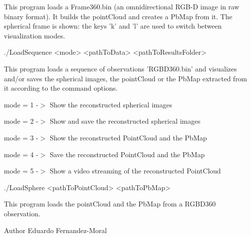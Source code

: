 This program loads a Frame360.\-bin (an omnidirectional R\-G\-B-\/\-D image in raw binary format). It builds the point\-Cloud and creates a Pb\-Map from it. The spherical frame is shown\-: the keys 'k' and 'l' are used to switch between visualization modes.

\begin{DoxyVerb}./LoadSequence <mode> <pathToData> <pathToResultsFolder>
\end{DoxyVerb}


This program loads a sequence of observations 'R\-G\-B\-D360.\-bin' and visualizes and/or saves the spherical images, the point\-Cloud or the Pb\-Map extracted from it according to the command options. \par
 mode = 1 -\/$>$ Show the reconstructed spherical images \par
 mode = 2 -\/$>$ Show and save the reconstructed spherical images \par
 mode = 3 -\/$>$ Show the reconstructed Point\-Cloud and the Pb\-Map \par
 mode = 4 -\/$>$ Save the reconstructed Point\-Cloud and the Pb\-Map \par
 mode = 5 -\/$>$ Show a video streaming of the reconstructed Point\-Cloud \par


\begin{DoxyVerb}./LoadSphere <pathToPointCloud> <pathToPbMap>
\end{DoxyVerb}


This program loads the point\-Cloud and the Pb\-Map from a R\-G\-B\-D360 observation. \par
 \par


\begin{DoxyAuthor}{Author}
Eduardo Fernandez-\/\-Moral 
\end{DoxyAuthor}
